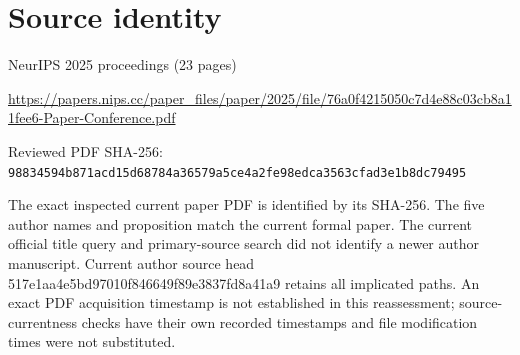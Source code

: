 \documentclass[11pt]{article}
\begin{document}
\section*{Source identity}

NeurIPS 2025 proceedings (23 pages)

\url{https://papers.nips.cc/paper_files/paper/2025/file/76a0f4215050c7d4e88c03cb8a11fee6-Paper-Conference.pdf}

Reviewed PDF SHA-256: \nolinkurl{98834594b871acd15d68784a36579a5ce4a2fe98edca3563cfad3e1b8dc79495}

The exact inspected current paper PDF is identified by its SHA-256. The five author names and proposition match the current formal paper. The current official title query and primary-source search did not identify a newer author manuscript. Current author source head 517e1aa4e5bd97010f846649f89e3837fd8a41a9 retains all implicated paths. An exact PDF acquisition timestamp is not established in this reassessment; source-currentness checks have their own recorded timestamps and file modification times were not substituted.
\end{document}
